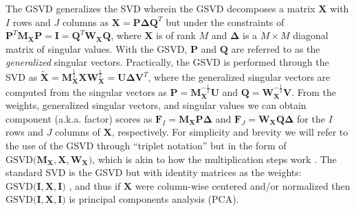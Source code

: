 \documentclass[12pt]{article}
\begin{document}
The GSVD generalizes the SVD wherein the GSVD decomposes a matrix
\({\mathbf X}\) with \(I\) rows and \(J\) columns as
\({\mathbf X} = {\mathbf P} {\boldsymbol \Delta} {\mathbf Q}^{T}\) but
under the constraints of
\({\mathbf P}^{T}{\mathbf M}_{{\mathbf X}}{\mathbf P} = {\mathbf I} = {\mathbf Q}^{T}{\mathbf W}_{{\mathbf X}}{\mathbf Q}\),
where \({\mathbf X}\) is of rank \(M\) and \({\boldsymbol \Delta}\) is a
\(M \times M\) diagonal matrix of singular values. With the GSVD,
\({\mathbf P}\) and \({\mathbf Q}\) are referred to as the
\emph{generalized} singular vectors. Practically, the GSVD is performed
through the SVD as
\(\widetilde{\mathbf X} = {\mathbf M}_{{\mathbf X}}^{\frac{1}{2}}{\mathbf X}{\mathbf W}_{{\mathbf X}}^{\frac{1}{2}} = {\mathbf U} {\boldsymbol \Delta} {\mathbf V}^{T}\),
where the generalized singular vectors are computed from the singular
vectors as
\({\mathbf P} = {\mathbf M}_{{\mathbf X}}^{-\frac{1}{2}}{\mathbf U}\)
and
\({\mathbf Q} = {\mathbf W}_{{\mathbf X}}^{-\frac{1}{2}}{\mathbf V}\).
From the weights, generalized singular vectors, and singular values we
can obtain component (a.k.a. factor) scores as
\({\mathbf F}_{I} = {\mathbf M}_{{\mathbf X}}{\mathbf P}{\boldsymbol \Delta}\)
and
\({\mathbf F}_{J} = {\mathbf W}_{{\mathbf X}}{\mathbf Q}{\boldsymbol \Delta}\)
for the \(I\) rows and \(J\) columns of \({\mathbf X}\), respectively.
For simplicity and brevity we will refer to the use of the GSVD through
``triplet notation'' \citep{holmes_multivariate_2008} but in the form of
\(\mathrm{GSVD(} {\mathbf M}_{{\mathbf X}}, {\mathbf X}, {\mathbf W}_{{\mathbf X}} \mathrm{)}\),
which is akin to how the multiplication steps work \citep[see
also][]{beaton2018generalization}. The standard SVD is the GSVD but with
identity matrices as the weights:
\(\mathrm{GSVD(} {\mathbf I}, {\mathbf X}, {\mathbf I} \mathrm{)}\)
\citep[see also][]{takane_relationships_2003}, and thus if
\({\mathbf X}\) were column-wise centered and/or normalized then
\(\mathrm{GSVD(} {\mathbf I}, {\mathbf X}, {\mathbf I} \mathrm{)}\) is
principal components analysis (PCA).
\end{document}
